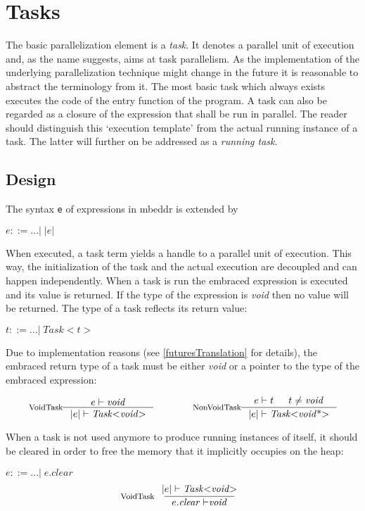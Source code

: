 \section{Tasks}
The basic parallelization element is a \textit{task}. It denotes a parallel unit of execution and, as the name suggests, aims at task parallelism. As the implementation of the underlying parallelization technique might change in the future it is reasonable to abstract the terminology from it. The most basic task which always exists executes the code of the entry function of the program. A task can also be regarded as a closure of the expression that shall be run in parallel. The reader should distinguish this `execution template' from the actual running instance of a task. The latter will further on be addressed as a \textit{running task}.
\subsection{Design}
\label{tasksDesign}
The syntax \texttt{e} of expressions in mbeddr is extended by

$e ::= ...|\;\mathit{|e|}$

When executed, a task term yields a handle to a parallel unit of execution. This way, the initialization of the task and the actual execution are decoupled and can happen independently. When a task is run the embraced expression is executed and its value is returned. If the type of the expression is \textit{void} then no value will be returned. The type of a task reflects its return value:

$t ::= ... |\;\mathit{Task{<}t{>}}$

Due to implementation reasons (see \ref{futuresTranslation} for details), the embraced return type of a task must be either \textit{void} or a pointer to the type of the embraced expression:

\begin{align*}
\inference*[VoidTask]{e |- \mathit{void}}{|e| |- \mathit{Task{<}void{>}}} 
\qquad\qquad
\inference*[NonVoidTask]{e |- t & t \neq \mathit{void}}{|e| |- \mathit{Task{<}void{\text{*}}{>}}}
\end{align*}

When a task is not used anymore to produce running instances of itself, it should be cleared in order to free the memory that it implicitly occupies on the heap:

$e ::= ...|\;e.\mathit{clear}$
\begin{align*}
\inference*[VoidTask]{|e| |- \mathit{Task{<}void{>}}}{e.\mathit{clear |-} \mathit{void}} 
\end{align*}

